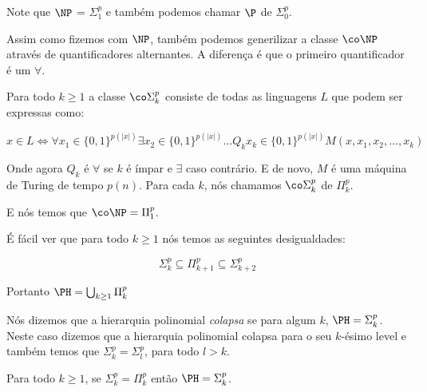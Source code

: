 Note que $\NP$ = $\Sigma_{1}^{p}$ e também podemos chamar $\P$ de $\Sigma_{0}^{p}$.

Assim como fizemos com $\NP$, também podemos generilizar a classe $\co\NP$ através de quantificadores alternantes. A diferença é que o primeiro quantificador é um $\forall$.

\begin{defi}

Para todo $k \geq 1$ a classe $\co\Sigma_{k}^{p}$ consiste de todas as linguagens $L$ que podem ser expressas como:

\begin{equation*}
    x \in L \iff \forall x_{1} \in \{0, 1\}^{p(\lvert x \rvert)} \exists x_{2} \in \{0, 1\}^{p(\lvert x \rvert)} \dots Q_{k} x_{k} \in \{0, 1\}^{p(\lvert x \rvert)} M(x, x_{1}, x_{2}, \dots, x_{k})
\end{equation*}

Onde agora $Q_{k}$ é $\forall$ se $k$ é ímpar e $\exists$ caso contrário. E de novo, $M$ é uma máquina de Turing de tempo $p(n)$. Para cada $k$, nós chamamos $\co\Sigma_{k}^{p}$ de $\Pi_{k}^{p}$.

\end{defi}

E nós temos que $\co\NP = \Pi_{1}^{p}$.

É fácil ver que para todo $k \geq 1$ nós temos as seguintes desigualdades:

\begin{equation*}
    \Sigma_{k}^{p} \subseteq \Pi_{k + 1}^{p} \subseteq \Sigma_{k + 2}^{p}
\end{equation*}

Portanto $\PH = \bigcup_{k \geq 1} \Pi_{k}^{p}$

Nós dizemos que a hierarquia polinomial \emph{colapsa} se para algum $k$, $\PH = \Sigma_{k}^{p}$. Neste caso dizemos que a hierarquia polinomial colapsa para o seu $k$-ésimo level e também temos que $\Sigma_{k}^{p} = \Sigma_{l}^{p}$, para todo $l > k$.

\begin{teo} \label{teo: phcollapse}

Para todo $k \geq 1$, se $\Sigma_{k}^{p} = \Pi_{k}^{p}$ então $\PH = \Sigma_{k}^{p}$.

\end{teo}

